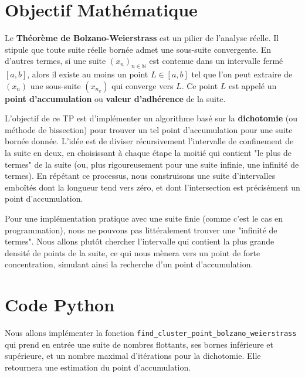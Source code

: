 \documentclass{report}
\begin{document}
\section*{Objectif Mathématique}

Le \textbf{Théorème de Bolzano-Weierstrass} est un pilier de l'analyse réelle. Il stipule que toute suite réelle bornée admet une sous-suite convergente. En d'autres termes, si une suite $(x_n)_{n \in \mathbb{N}}$ est contenue dans un intervalle fermé $[a, b]$, alors il existe au moins un point $L \in [a, b]$ tel que l'on peut extraire de $(x_n)$ une sous-suite $(x_{n_k})$ qui converge vers $L$. Ce point $L$ est appelé un \textbf{point d'accumulation} ou \textbf{valeur d'adhérence} de la suite.

L'objectif de ce TP est d'implémenter un algorithme basé sur la \textbf{dichotomie} (ou méthode de bissection) pour trouver un tel point d'accumulation pour une suite bornée donnée. L'idée est de diviser récursivement l'intervalle de confinement de la suite en deux, en choisissant à chaque étape la moitié qui contient "le plus de termes" de la suite (ou, plus rigoureusement pour une suite infinie, une infinité de termes). En répétant ce processus, nous construisons une suite d'intervalles emboîtés dont la longueur tend vers zéro, et dont l'intersection est précisément un point d'accumulation.

Pour une implémentation pratique avec une suite finie (comme c'est le cas en programmation), nous ne pouvons pas littéralement trouver une "infinité de termes". Nous allons plutôt chercher l'intervalle qui contient la plus grande densité de points de la suite, ce qui nous mènera vers un point de forte concentration, simulant ainsi la recherche d'un point d'accumulation.

\section*{Code Python}

Nous allons implémenter la fonction \texttt{find\_cluster\_point\_bolzano\_weierstrass} qui prend en entrée une suite de nombres flottants, ses bornes inférieure et supérieure, et un nombre maximal d'itérations pour la dichotomie. Elle retournera une estimation du point d'accumulation.
\end{document}

